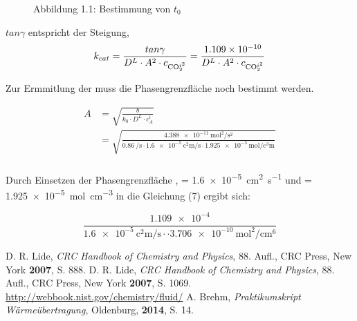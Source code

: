 \documentclass{article}
\begin{document}
\begin{onehalfspace}
\begin{figure}[htbp!]
\caption*{Abbildung 1.1: Bestimmung von $t_0$ }

\end{figure}
$tan \gamma$ entspricht der Steigung, 
\begin{equation}
  k_{cat} = \frac{tan \gamma}{D^L \cdot A^2 \cdot c_{\ce{CO2}^{i^2}}} = \frac{\num{1.109e-10}}{D^L \cdot A^2 \cdot c_{\ce{CO2}^{i^2}}}
\end{equation}

Zur Ermmitlung der  muss die Phasengrenzfläche  noch bestimmt werden. 

\begin{align}
  A &= \sqrt{\frac{b}{k_0 \cdot D^L \cdot c_A^i}} \\
    &= \sqrt{\frac{\SI{4.388e-11}{\square\mol\per\square\second}}{\SI{0.86}{\per\second} \cdot \SI{1.6e-5}{\square\centi\meter\per\second} \cdot \SI{1.925e-5}{\mol\per\cubic\centi\meter} }}\\
\end{align}

Durch Einsetzen der Phasengrenzfläche ,  = \SI{1.6e-5}{\square\centi\meter\per\second} 
und  = \SI{1.925e-5}{\mol\per\cubic\centi\meter} in die Gleichung (7) ergibt sich:

\begin{equation}
 \frac{\num{1.109e-4}}{\SI{1.6e-5}{\square\centi\meter\per\second} \cdot  \cdot \SI{3.706e-10}{\square\mol\per\centi\meter\tothe{6}} }
\end{equation}

\begin{thebibliography}{}
D. R. Lide, \textit{CRC Handbook of Chemistry and Physics}, 88. Aufl., CRC Press, New York \textbf{2007}, S. 888.
D. R. Lide, \textit{CRC Handbook of Chemistry and Physics}, 88. Aufl., CRC Press, New York \textbf{2007}, S. 1069.
\url{http://webbook.nist.gov/chemistry/fluid/}
A. Brehm, \textit{Praktikumskript Wärmeübertragung}, Oldenburg, \textbf{2014},  S. 14.
\end{thebibliography}
\end{onehalfspace}
\end{document}
